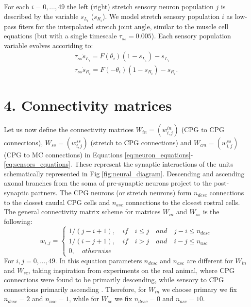 \documentclass{cmc}
\begin{document}
For each $i=0,...,49$ the left (right) stretch sensory neuron population $j$ is described by the variable $s_{L_i}$ ($s_{R_i}$). We model stretch sensory population $i$ as low-pass fiters for the interpolated stretch joint angle, similar to the muscle cell equations (but with a single timescale $\tau_{ss}=0.005$). Each sensory population variable evolves accoriding to:
\begin{equation}
    \begin{array}{lcl}
	\tau_{ss} \dot{s}_{L_i} = F(\theta_i) (1-s_{L_i}) - s_{L_i}\\
	\tau_{ss} \dot{s}_{R_i} = F(-\theta_i) (1-s_{R_i}) - s_{R_i}.
    \end{array}
	\label{eq:sensors_equations}
\end{equation}

\section*{4. Connectivity matrices}
Let us now define the connectivity matrices $W_{in}=(w^{in}_{i,j})$ (CPG to CPG connections), $W_{ss}=(w^{ss}_{i,j})$ (stretch to CPG connections) and $W_{cm}=(w^{ss}_{i,j})$ (CPG to MC connections) in Equations \ref{eq:neuron_equations}-\ref{eq:sensors_equations}. These represent the synaptic interactions of the units schematically represented in Fig \ref{fig:neural_diagram}. Descending and ascending axonal branches from the soma of pre-synaptic neurons project to the post-synaptic partners. The CPG neurons (or stretch neurons) form $n_{desc}$ connections to the closest caudal CPG cells and $n_{asc}$ connections to the closest rostral cells. The general connectivity matrix scheme for matrices $W_{in}$ and $W_{ss}$ is the following:
\begin{equation}
    w_{i,j} = \begin{cases}
      1/(j-i+1), \quad if \quad i \leq j \quad and \quad j-i \leq n_{desc}\\
      1/(i-j+1), \quad if \quad i>j \quad and \quad i-j \leq n_{asc}\\
      0, \quad otherwise
    \end{cases}
\end{equation}
For $i,j=0,...,49$. In this equation parameters $n_{desc}$ and $n_{asc}$ are different for $W_{in}$ and $W_{sc}$, taking inspiration from experiments on the real animal, where CPG connections were found to be primarily descending, while sensory to CPG connections primarily ascending \cite{picton_developmental_2022, picton_spinal_2021}. Therefore, for $W_{in}$ we choose primary we fix $n_{desc}=2$ and $n_{asc}=1$, while for $W_{sc}$ we fix $n_{desc}=0$ and $n_{asc}=10$.
\end{document}
